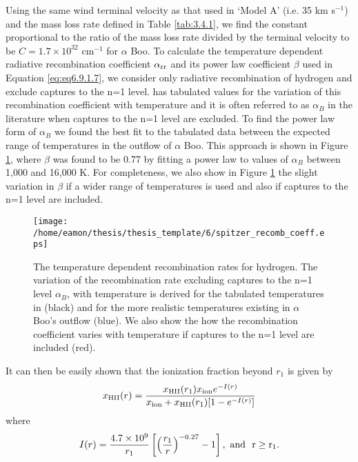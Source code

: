 Using the same wind terminal velocity as that used in `Model A' (i.e. 35 km s$^{-1}$) and the mass loss rate defined in Table \ref{tab:3.4.1}, we find the constant proportional to the ratio of the mass loss rate divided by the terminal velocity to be $C = 1.7 \times 10^{32} $ cm$^{-1}$ for $\alpha$ Boo. To calculate the temperature dependent radiative recombination coefficient $\alpha _{\rm{rr}}$ and its power law coefficient $\beta$ used in Equation \ref{eq:eq6.9.1.7}, we consider only radiative recombination of hydrogen and exclude captures to the n=1 level. \cite{spitzer_1978} has tabulated values for the variation of this recombination coefficient with temperature and it is often referred to as $\alpha _{B}$ in the literature when captures to the n=1 level are excluded. To find the power law form of $\alpha _{B}$ we found the best fit to the tabulated data between the expected range of temperatures in the outflow of $\alpha$ Boo. This approach is shown in Figure \ref{fig6.9.2}, where $\beta$ was found to be 0.77 by fitting a power law to values of $\alpha _{B}$ between 1,000 and 16,000 K. For completeness, we also show in Figure \ref{fig6.9.2} the slight variation in $\beta$ if a wider range of temperatures is used and also if captures to the n=1 level are included.
\begin{figure}[hbt!]
\centering 
          \texttt{[image: /home/eamon/thesis/thesis\_template/6/spitzer\_recomb\_coeff.eps]}
\caption[The temperature dependent recombination rates for hydrogen.]{The temperature dependent recombination rates for hydrogen. The variation of the recombination rate excluding captures to the n=1 level $\alpha _{B}$, with temperature  is derived for the tabulated temperatures in \cite{spitzer_1978} (black) and for the more realistic temperatures existing in $\alpha$ Boo's outflow (blue). We also show the how the recombination coefficient varies with temperature if captures to the n=1 level are included (red).}
\label{fig6.9.2}
\end{figure}
It can then be easily shown that the ionization fraction beyond $r_{1}$ is given by 
\begin{equation}
x_{\rm{HII}}(r)= \frac{x_{\rm{HII}}(r_1)x_{\rm{ion}}e^{-I(r)}}{x_{\rm{ion}}+x_{\rm{HII}}(r_1)[1 - e^{-I(r)}]}
\label{eq:eq4}
\end{equation}
where
\begin{equation}
I(r) = \frac{4.7\times 10^9}{r_{1}}\left[\left( \frac{r_{1}}{r}\right)^{-0.27} -1 \right], \ \rm{and} \ \  r \geq r_{1}.
\label{eq:eq5}
\end{equation}

